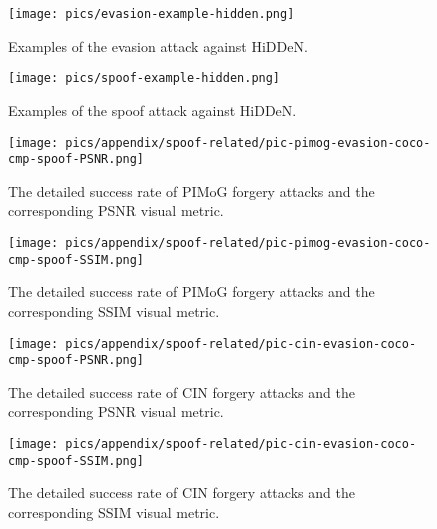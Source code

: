 
\begin{figure}[!t]
    \centering
    \texttt{[image: pics/evasion-example-hidden.png]} 
   
    \vspace{-3mm}
    \caption{Examples of the evasion attack against HiDDeN.}
    \label{fig:evasion-hidden}
\end{figure}

\begin{figure}[!t]
    \centering
    \texttt{[image: pics/spoof-example-hidden.png]} 
    
    \vspace{-3mm}
    \caption{Examples of the spoof attack against HiDDeN.}
    \label{fig:spoof-hidden}
\end{figure}

\begin{figure}[!t]
\begin{minipage}{0.48\linewidth}
    \centering
    \texttt{[image: pics/appendix/spoof-related/pic-pimog-evasion-coco-cmp-spoof-PSNR.png]} 
   
    \vspace{-3mm}
    \caption{The detailed success rate of PIMoG forgery attacks and the corresponding PSNR visual metric.}
    \label{fig:spoof-related-pimog-psnr}
\end{minipage}\hfill
\begin{minipage}{0.48\linewidth}
    \centering
    \texttt{[image: pics/appendix/spoof-related/pic-pimog-evasion-coco-cmp-spoof-SSIM.png]} 
    
    \vspace{-3mm}
    \caption{The detailed success rate of PIMoG forgery attacks and the corresponding SSIM visual metric.}
    \label{fig:spoof-related-pimog-ssim}
\end{minipage}
\end{figure}

\begin{figure}[!t]
\begin{minipage}{0.48\linewidth}
    \centering
    \texttt{[image: pics/appendix/spoof-related/pic-cin-evasion-coco-cmp-spoof-PSNR.png]} 
   
    \vspace{-6mm}
    \caption{The detailed success rate of CIN forgery attacks and the corresponding PSNR visual metric.}
    \label{fig:spoof-related-cin-psnr}
\end{minipage}\hfill
\begin{minipage}{0.48\linewidth}
    \centering
    \texttt{[image: pics/appendix/spoof-related/pic-cin-evasion-coco-cmp-spoof-SSIM.png]} 
    
    \vspace{-6mm}
    \caption{The detailed success rate of CIN forgery attacks and the corresponding SSIM visual metric.}
    \label{fig:spoof-related-cin-ssim}
\end{minipage}
\end{figure}

